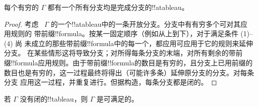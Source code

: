 \documentclass[../../../include/open-logic-section]{subfiles}
\begin{document}
\begin{prop}
  每个有穷的 $\Gamma$ 都有一个所有分支均是完成分支的!!a{tableau}。
\end{prop}

\begin{proof}
  考虑 ~$\Gamma$ 的一个!!a{tableau}中的一条开放分支。分支中有有穷多个可对其应用规则的
  带前缀!!{formula}。按某一固定顺序（例如从上到下），对于满足条件 (1)--(4) 尚
  未成立的那些带前缀!!{formula}中的每一个，都应用可应用于它的规则来延伸分支。
  在某些情形这将导致分支；对所得每条分支的末端，对所有剩余的带前缀!!{formula}应用规则。由于带前缀!!{formula}的数目是有穷的，且分支上已用前缀的
  数目也是有穷的，这一过程最终将得出（可能许多条）延伸原分支的分支。对每条分支
  应用这一过程，并重复进行。但据构造，每条分支都是闭的。
\end{proof}

\begin{thm}[完全性]
  若 $\Gamma$ 没有闭的!!{tableau}，则 $\Gamma$ 是可满足的。
\end{thm}
\end{document}

